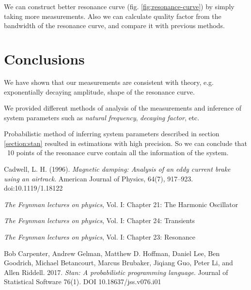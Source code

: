 \documentclass[12pt,a4paper]{article}
\begin{document}
	We can construct better resonance curve (fig. \ref{fig:resonance-curve}) by simply taking more measurements. Also we can calculate quality factor from the bandwidth of the resonance curve\cite{feynman-resonance}, and compare it with previous methods.
	
\section{Conclusions}\label{section:conclusions}
	We have shown that our measurements are consistent with theory, e.g. exponentially decaying amplitude, shape of the resonance curve.
	
	We provided different methods of analysis of the measurements and inference of system parameters such as \emph{natural frequency}, \emph{decaying factor}, etc.

	Probabilistic method of inferring system parameters described in section \ref{section:stan} resulted in estimations with high precision. So we can conclude that ~10 points of the resonance curve contain all the information of the system.
	
	
\pagebreak
\begin{thebibliography}{9}
     Cadwell, L. H. (1996). \emph{Magnetic damping: Analysis of an eddy current brake using an airtrack}. American Journal of Physics, 64(7), 917–923. doi:10.1119/1.18122 
    
     \emph{The Feynman lectures on physics}, Vol. I: Chapter 21: The Harmonic Oscillator
    
    \emph{The Feynman lectures on physics}, Vol. I: Chapter 24: Transients
   
       
    \emph{The Feynman lectures on physics}, Vol. I: Chapter 23: Resonance
    
     Bob Carpenter, Andrew Gelman, Matthew D. Hoffman, Daniel Lee, Ben Goodrich, Michael Betancourt, Marcus Brubaker, Jiqiang Guo, Peter Li, and Allen Riddell. 2017. \emph{Stan: A probabilistic programming language}. Journal of Statistical Software 76(1). DOI 10.18637/jss.v076.i01
    
    
\end{thebibliography}
\end{document}
